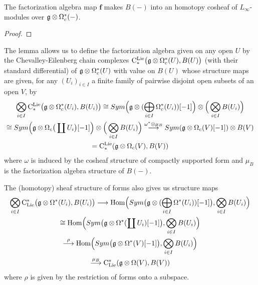 \documentclass[11pt]{amsart}
\numberwithin{equation}{section}
\begin{document}
\begin{lmm}\label{L:inducedFacgModstruct} The factorization algebra map  $\mathbf{f}$ makes $B(-)$ into an homotopy cosheaf of $L_\infty$-modules over 
 $\mathfrak g \otimes \Omega^*_c(-)$.
\end{lmm}
\begin{proof}
 
\end{proof}
The lemma allows us to define the factorization algebra given on any open $U$ by  the Chevalley-Eilenberg chain complexes
$ {\rm C}^{\rm Lie}_*\big(\mathfrak g \otimes \Omega^*_c(U), B(U) \big)$ (with their standard differential)
of $\mathfrak g \otimes \Omega^*_c(U)$ with value on $B(U)$ whose structure maps are given, for any $(U_i)_{i\in I}$ 
a finite family of pairwise disjoint open subsets of an open $V$, by 
\begin{multline}\label{eq:transClieFac}
 \bigotimes_{i\in I} {\rm C}^{\rm Lie}_*\big(\mathfrak g \otimes \Omega^*_c(U_i), B(U_i) \big) \cong Sym\Big(
 \mathfrak g\otimes (\bigoplus_{i\in I}  \Omega^*_c(U_i))[-1]  \Big) \otimes \Big( \bigotimes_{i\in I} B(U_i)\Big) \\ 
 \cong Sym\Big(\mathfrak g\otimes \Omega_c\big(\coprod U_i\big)[-1] \Big) \otimes \Big( \bigotimes_{i\in I} B(U_i)\Big)  
 \stackrel{\omega^*\otimes \mu_B}\longrightarrow Sym(\mathfrak g\otimes \Omega_c(V)[-1] ) \otimes B(V) \\ 
 = {\rm C}^{\rm Lie}_*(\mathfrak g\otimes \Omega_c(V), B(V))
\end{multline}
where $\omega$ is induced by the cosheaf structure of compactly supported form and $\mu_B$ is the factorization algebra structure of $B(-)$.

\smallskip

The (homotopy) sheaf structure of forms also gives us structure maps
\begin{multline}\label{eq:transClieFacCochain}
 \bigotimes_{i\in I} {\rm C}_{\rm Lie}^*\big(\mathfrak g \otimes \Omega^*(U_i), B(U_i) \big) \longrightarrow
  {\rm Hom}\Big(Sym\big(\mathfrak g\otimes (\bigoplus_{i\in I}  \Omega^*(U_i))[-1]\big),  \bigotimes\limits_{i\in I} B(U_i) \Big) \\
 \cong {\rm Hom}\Big(Sym\big(\mathfrak g\otimes \Omega^*(\coprod U_i)[-1]\big), \bigotimes\limits_{i\in I} B(U_i) \Big) \\
 \stackrel{\rho}\longrightarrow {\rm Hom}\Big(Sym\big(\mathfrak g\otimes \Omega^*(V)[-1]\big), \bigotimes\limits_{i\in I} B(U_i) \Big) \\
 \stackrel{\mu_B}\longrightarrow 
  {\rm C}_{\rm Lie}^*(\mathfrak g\otimes \Omega (V), B(V))
\end{multline}
where $\rho$ is given by the restriction of forms onto a subspace. 
\end{document}
